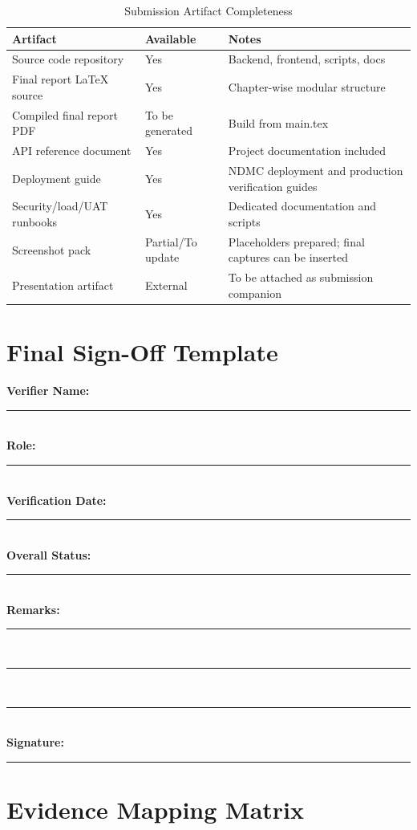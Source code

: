 \begin{table}[H]
\centering
\caption{Submission Artifact Completeness}
\begin{tabularx}{\textwidth}{|p{}|p{}|X|}
\toprule
\textbf{Artifact} & \textbf{Available} & \textbf{Notes} \\
\midrule
Source code repository & Yes & Backend, frontend, scripts, docs \\
Final report LaTeX source & Yes & Chapter-wise modular structure \\
Compiled final report PDF & To be generated & Build from main.tex \\
API reference document & Yes & Project documentation included \\
Deployment guide & Yes & NDMC deployment and production verification guides \\
Security/load/UAT runbooks & Yes & Dedicated documentation and scripts \\
Screenshot pack & Partial/To update & Placeholders prepared; final captures can be inserted \\
Presentation artifact & External & To be attached as submission companion \\
\bottomrule
\end{tabularx}
\end{table}

\section{Final Sign-Off Template}

\noindent
\textbf{Verifier Name:} \rule{0.55\textwidth}{0.4pt}\\[0.6em]
\textbf{Role:} \rule{0.69\textwidth}{0.4pt}\\[0.6em]
\textbf{Verification Date:} \rule{0.53\textwidth}{0.4pt}\\[0.6em]
\textbf{Overall Status:} \rule{0.56\textwidth}{0.4pt}\\[0.6em]
\textbf{Remarks:}\\[0.4em]
\rule{0.95\textwidth}{0.4pt}\\[1.2em]
\rule{0.95\textwidth}{0.4pt}\\[1.2em]
\rule{0.95\textwidth}{0.4pt}\\[1.6em]
\textbf{Signature:} \rule{0.60\textwidth}{0.4pt}

\section{Evidence Mapping Matrix}

